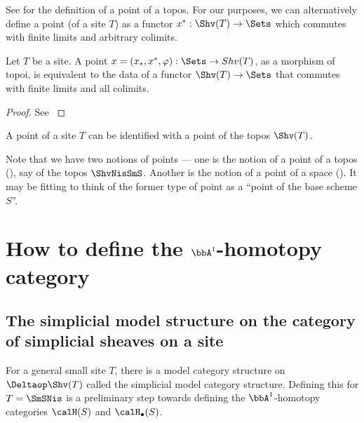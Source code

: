 See  for the definition of a point of a topos. For our purposes, we can alternatively define a point (of a site $T$) as a functor $x^*: \Shv(T) \to \Sets$ which commutes with finite limits and arbitrary colimits.
\begin{lemma}
    Let $T$ be a site. A point $x = (x_*, x^*, \varphi): \Sets \to Shv(T)$, as a morphism of topoi, is equivalent to the data of a functor $\Shv(T) \to \Sets$ that commutes with finite limits and all colimits.
\end{lemma}
\begin{proof}
    See \cite[\href{https://stacks.math.columbia.edu/tag/00Y3}{Tag 00Y3}]{stacks-project} 
\end{proof}
\begin{convention}
    A point of a site $T$ can be identified with a point of the topos $\Shv(T)$. 
\end{convention}




\begin{remark}
    Note that we have two notions of points --- one is the notion of a point of a topos (), say of the topos $\ShvNisSmS$. Another is the notion of a point of a space (). It may be fitting to think of the former type of point as a ``point of the base scheme $S$''.
\end{remark}

\section{How to define the \texorpdfstring{$\bbA^1$}{A1}-homotopy category}

\subsection{The simplicial model structure on the category of simplicial sheaves on a site}


For a general small site $T$, there is a model category structure on $\Deltaop\Shv(T)$ called the simplicial model category structure. Defining this for $T = \SmSNis$ is a preliminary step towards defining the $\bbA^1$-homotopy categories $\calH(S)$ and $\calH_\bullet(S)$.



